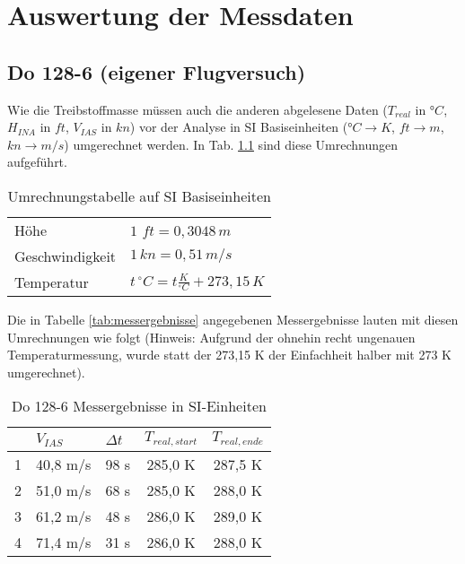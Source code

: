 \chapter{Auswertung der Messdaten}
\label{chapter:auswertung}

\section{Do 128-6 (eigener Flugversuch)} \label{section:128}
Wie die Treibstoffmasse müssen auch die anderen abgelesene Daten ($T_{real}$ in °$C$, $H_{INA}$ in $ft$, $V_{IAS}$ in $kn$) vor der Analyse in SI Basiseinheiten (°$C  \rightarrow K$, $ft \rightarrow m$, $kn \rightarrow m/s$) umgerechnet werden. In Tab. \ref{tab:umrechnung_einheiten} sind diese Umrechnungen aufgeführt.\\

\begin{table}[h]
	\centering
	\begin{tabular}{l l}
		\hline
		Höhe 			& $1$ $ft = 0,3048\,m$ 								\\
		Geschwindigkeit	&   $1\,kn = 0,51\,m/s$								\\
		Temperatur 		&  $t\,^\circ C = t\frac{K}{^\circ C}+273,15\,K$	\\
		\hline		
	\end{tabular}
	\caption{Umrechnungstabelle auf SI Basiseinheiten} \label{tab:umrechnung_einheiten}
\end{table}

\noindent Die in Tabelle \ref{tab:messergebnisse} angegebenen Messergebnisse lauten mit diesen Umrechnungen wie folgt (Hinweis: Aufgrund der ohnehin recht ungenauen Temperaturmessung, wurde statt der 273,15 K der Einfachheit halber mit 273 K umgerechnet).

\begin{table}[h]
	\centering
	\begin{tabular}{|c|c|c|c|c|}
		\hline
		& \multicolumn{1}{l|}{\textbf{$V_{IAS}$}} & \multicolumn{1}{l|}{\textbf{$\Delta t$}} & \multicolumn{1}{l|}{\textbf{$T_{real,start}$}} & \multicolumn{1}{l|}{\textbf{$T_{real,ende}$}} \\ \hline
		1 & 40,8 m/s         & 98 s         & 285,0 K         & 287,5 K    \\ \hline
		2 & 51,0 m/s         & 68 s         & 285,0 K         & 288,0 K    \\ \hline
		3 & 61,2 m/s         & 48 s         & 286,0 K         & 289,0 K    \\ \hline
		4 & 71,4 m/s         & 31 s         & 286,0 K         & 288,0 K    \\ \hline
	\end{tabular}
	\caption{Do 128-6 Messergebnisse in SI-Einheiten} \label{tab:messergebnisse-si}
\end{table}

